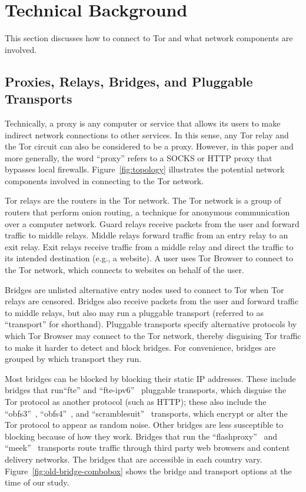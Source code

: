 \documentclass[USenglish,oneside,twocolumn]{article}
\begin{document}
\section{Technical Background}
\label{sec:background}
This section discusses how to connect to Tor and what network components are involved. 

\subsection{Proxies, Relays, Bridges, and Pluggable Transports} 

Technically, a proxy is any computer or service that allows its users to make indirect network connections to other services. In this sense, any Tor relay and the Tor circuit can also be considered to be a proxy. However, in this paper and more generally, the word ``proxy'' refers to a SOCKS or HTTP proxy that bypasses local firewalls. Figure~\ref{fig:topology} illustrates the potential network components involved in connecting to the Tor network.

Tor relays are the routers in the Tor network. The Tor network is a group of routers that perform onion routing, a technique for anonymous communication over a computer network.  Guard relays receive packets from the user and forward traffic to middle relays. Middle relays forward traffic from an entry relay to an exit relay. Exit relays receive traffic from a middle relay and direct the traffic to its intended destination (e.g., a website).  A user uses Tor Browser to connect to the Tor network, which connects to websites on behalf of the user. 

Bridges are unlisted alternative entry nodes used to connect to Tor when Tor relays are censored.
Bridges also receive packets from the user and forward traffic to middle relays, but also may run a pluggable transport (referred to as ``transport'' for shorthand). Pluggable transports specify alternative protocols by which Tor Browser may connect to the Tor network, thereby disguising Tor traffic to make it harder to detect and block bridges. For convenience, bridges are grouped by which transport they run. 

Most bridges can be blocked by blocking their static IP addresses. These include bridges that run``fte'' and ``fte-ipv6''~\cite{fte} pluggable transports, which disguise the Tor protocol as another protocol (such as HTTP); these also include the ``obfs3''~\cite{obfs3}, ``obfs4''~\cite{obfs4}, and ``scramblesuit''~\cite{scramblesuit} transports, which encrypt or alter the Tor protocol to appear as random noise. Other bridges are less susceptible to blocking because of how they work. Bridges that run the ``flashproxy''~\cite{flashproxy} and ``meek''~\cite{fifield2015blocking} transports route traffic through third party web browsers and content delivery networks. The bridges that are accessible in each country vary. Figure~\ref{fig:old-bridge-combobox} shows the bridge and transport options at the time of our study. 
\end{document}
